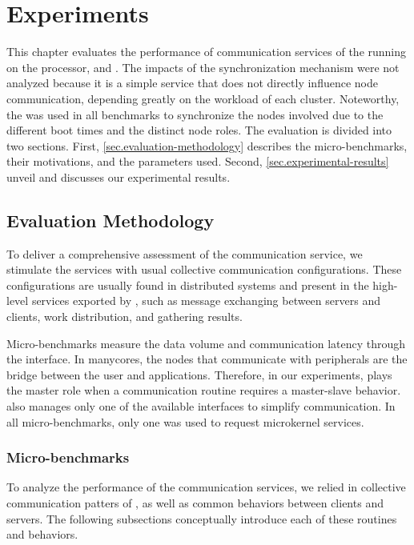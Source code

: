 \chapter{Experiments}
\label{ch.experiments}

	This chapter evaluates the performance of communication services of
	the \nanvixmicrokernel running on the \mppa processor, \ie \mailbox
	and \portal. The impacts of the synchronization mechanism were not
	analyzed because it is a simple service that does not directly
	influence node communication, depending greatly on the workload of
	each cluster. Noteworthy, the \sync was used in all benchmarks to
	synchronize the nodes involved due to the different boot times and
	the distinct node roles. The evaluation is divided into two sections.
	First, \autoref{sec.evaluation-methodology} describes the
	micro-benchmarks, their motivations, and the parameters used. Second,
	\autoref{sec.experimental-results} unveil and discusses our
	experimental results.

	\section{Evaluation Methodology}
	\label{sec.evaluation-methodology}

		To deliver a comprehensive assessment of the communication service, we
		stimulate the services with usual collective communication configurations.
		These configurations are usually found in distributed systems and present
		in the high-level services exported by \nanvixmultikernel, such as
		message exchanging between servers and clients, work distribution, and
		gathering results.

        Micro-benchmarks measure the data volume and communication latency
		through the \ioctl interface. In manycores, the nodes that communicate
		with peripherals are the bridge between the user and applications.
		Therefore, in our experiments, \iocluster plays the master role when a
		communication routine requires a master-slave behavior. \ioclusters also
		manages only one of the available interfaces to simplify communication.
		In all micro-benchmarks, only one \pe was used to request microkernel
		services.

		\subsection{Micro-benchmarks}

			To analyze the performance of the communication services, we
			relied in collective communication patters of \mpi, as well as
			common behaviors between clients and servers. The following
			subsections conceptually introduce each of these routines and
			behaviors.

